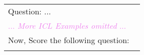 \begin{longtable}{p{0.95\linewidth}}
Question: ...\\
\textcolor{violet}{... \textit{More ICL Examples omitted} ...}\\
Now, Score the following question:\\\\

\end{longtable}


\twocolumn